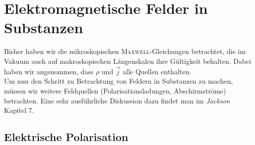 \chapter{Elektromagnetische Felder in Substanzen}

Bisher haben wir die mikroskopischen \textsc{Maxwell}-Gleichungen betrachtet, die im Vakuum auch auf makroskopischen Längenskalen ihre Gültigkeit behalten. Dabei haben wir angenommen, dass $\rho$ und $\vec{j}$ alle Quellen enthalten. \\
Um nun den Schritt zu Betrachtung von Feldern in Substanzen zu machen, müssen wir weitere Feldquellen (Polarisationsladungen, Abschirmströme) betrachten. Eine sehr ausführliche Diskussion dazu findet man im \emph{Jackson} Kapitel 7.

\section{Elektrische Polarisation}

